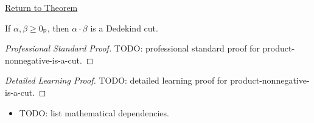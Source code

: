 \newpage
{}
\label{prf:product-nonnegative-is-a-cut}

\begin{remark*}[Return]
\hyperref[lem:product-nonnegative-is-a-cut]{Return to Theorem}
\end{remark*}

\begin{lemma*}
If $\alpha,\beta\ge 0_{\mathbb{R}}$, then $\alpha\cdot\beta$ is a Dedekind cut.
\end{lemma*}

\begin{proof}[Professional Standard Proof]
\LRAProofBodyStart
TODO: professional standard proof for product-nonnegative-is-a-cut.
\end{proof}

\begin{proof}[Detailed Learning Proof]
\LRAProofBodyStart
TODO: detailed learning proof for product-nonnegative-is-a-cut.
\end{proof}

\begin{remark*}
\end{remark*}

\begin{dependencies}
\begin{itemize}
  \item TODO: list mathematical dependencies.
\end{itemize}
\end{dependencies}

\clearpage
